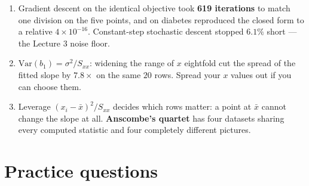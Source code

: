 \documentclass[11pt]{article}
\begin{document}
\begin{enumerate}[leftmargin=*]
    $(\bar x,\bar y)$, $\sum x_ie_i = 0$ and
    $\mathrm{SST}=\mathrm{SSR}+\mathrm{SSE}$. Drop the intercept and the first
    of those became $+2.0$. Zero residual sum is necessary but
    \textbf{not sufficient}: three of four candidate lines had it.
  \item Gradient descent on the identical objective took \textbf{619
    iterations} to match one division on the five points, and on diabetes
    reproduced the closed form to a relative $4\times10^{-16}$. Constant-step
    stochastic descent stopped $6.1\%$ short --- the Lecture 3 noise floor.
  \item $\mathrm{Var}(b_1)=\sigma^2/S_{xx}$: widening the range of $x$
    eightfold cut the spread of the fitted slope by $7.8\times$ on the same
    $20$ rows. Spread your $x$ values out if you can choose them.
  \item Leverage $(x_i-\bar x)^2/S_{xx}$ decides which rows matter: a point at
    $\bar x$ cannot change the slope at all. \textbf{Anscombe's quartet} has
    four datasets sharing every computed statistic and four completely
    different pictures.
\end{enumerate}

\section{Practice questions}
\label{sec:questions}
\end{document}
